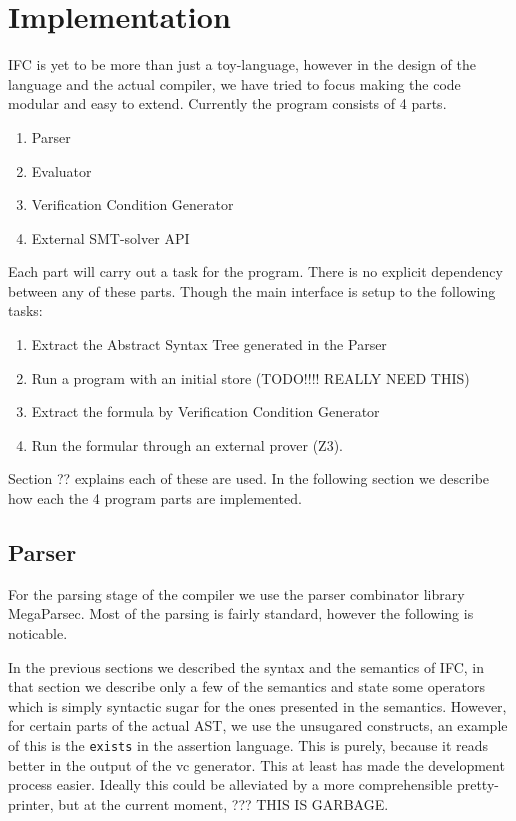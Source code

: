 \section{Implementation}
IFC is yet to be more than just a toy-language, however in the design of the language and the actual compiler, we have tried to focus making the code modular and easy to extend.
Currently the program consists of 4 parts.
\begin{enumerate}
  \item Parser
  \item Evaluator
  \item Verification Condition Generator
  \item External SMT-solver API
\end{enumerate}
Each part will carry out a task for the program. There is no explicit dependency between any of these parts. Though the main interface is setup to the following tasks:
\begin{enumerate}
  \item Extract the Abstract Syntax Tree generated in the Parser
  \item Run a program with an initial store (TODO!!!! REALLY NEED THIS)
  \item Extract the formula by Verification Condition Generator
  \item Run the formular through an external prover (Z3).
\end{enumerate}
Section ?? explains each of these are used. In the following section we describe how each the 4 program parts are implemented.

\subsection{Parser}
For the parsing stage of the compiler we use the parser combinator library MegaParsec. Most of the parsing is fairly standard, however the following is noticable.

In the previous sections we described the syntax and the semantics of IFC, in that section we describe only a few of the semantics and state some operators which is simply syntactic sugar for the ones presented in the semantics. However, for certain parts of the actual AST, we use the unsugared constructs, an example of this is the \texttt{exists} in the assertion language. This is purely, because it reads better in the output of the vc generator. This at least has made the development process easier. Ideally this could be alleviated by a more comprehensible pretty-printer, but at the current moment, ??? THIS IS GARBAGE.


